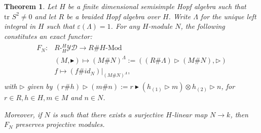 \documentclass{amsart}
\newtheorem{theorem}{Theorem}
\theoremstyle{definition}
\newcommand{\YD}[1]{\ensuremath{{}^{#1}_{#1}\mathcal{YD}}}
\begin{document}
	\begin{theorem}
		Let $H$ be a finite dimensional semisimple Hopf algebra  such that $\text{tr } S^2 \neq 0$ and let $R$ be a braided Hopf algebra over $H$. Write $\Lambda$ for the unique left integral in $H$ such that $\varepsilon(\Lambda)=1$.
		For any $H$-module $N$, the following constitutes an exact functor:
		\begin{align}
		\begin{aligned}
		F_N\colon &R\text{-}\YD{H} \rightarrow R\#H\text{-}\text{Mod} \\
		& ( M,\blacktriangleright) \mapsto 
		\left(M\#N\right)^\Lambda:=((R\# \Lambda)\triangleright(M\#N),\triangleright)\\
		&f \mapsto \left(f\# id_N\right) |_{	\left(M\#N\right)^\Lambda},
		\end{aligned}
		\end{align}
		with $\triangleright$ given by $\left(r\#h\right) \triangleright \left(m\#n\right) :=  
		r\blacktriangleright(h_{(1)}\triangleright m) \otimes h_{(2)}\triangleright n$, for ${r \in R}, {h \in H}, {m\in M}$ and  $n \in N$.
		
		Moreover, if $N$ is such that there exists a surjective $H$-linear map $N \rightarrow k$, then $F_N$ preserves projective modules.
	\end{theorem}
\end{document}
